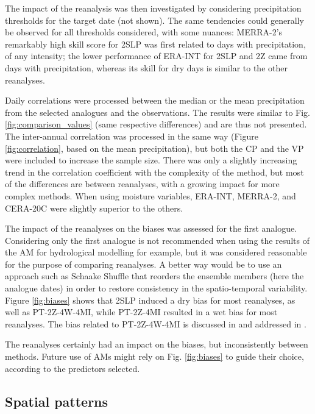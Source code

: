 \documentclass[smallextended]{svjour3}       %
\begin{document}
	The impact of the reanalysis was then investigated by considering precipitation thresholds for the target date (not shown). The same tendencies could generally be observed for all thresholds considered, with some nuances: MERRA-2's remarkably high skill score for 2SLP was first related to days with precipitation, of any intensity; the lower performance of ERA-INT for 2SLP and 2Z came from days with precipitation, whereas its skill for dry days is similar to the other reanalyses.
	
	Daily correlations were processed between the median or the mean precipitation from the selected analogues and the observations. The results were similar to Fig. \ref{fig:comparison_values} (same respective differences) and are thus not presented. The inter-annual correlation was processed in the same way (Figure \ref{fig:correlation}, based on the mean precipitation), but both the CP and the VP were included to increase the sample size. There was only a slightly increasing trend in the correlation coefficient with the complexity of the method, but most of the differences are between reanalyses, with a growing impact for more complex methods. When using moisture variables, ERA-INT, MERRA-2, and CERA-20C were slightly superior to the others.
	
	The impact of the reanalyses on the biases was assessed for the first analogue. Considering only the first analogue is not recommended when using the results of the AM for hydrological modelling for example, but it was considered reasonable for the purpose of comparing reanalyses. A better way would be to use an approach such as Schaake Shuffle \citep{Clark2004a} that reorders the ensemble members (here the analogue dates) in order to restore consistency in the spatio-temporal variability. Figure \ref{fig:biases} shows that 2SLP induced a dry bias for most reanalyses, as well as PT-2Z-4W-4MI, while PT-2Z-4MI resulted in a wet bias for most reanalyses. The bias related to PT-2Z-4W-4MI is discussed in \citet{Caillouet2016} and addressed in \citet{Caillouet2017}. 
	
	The reanalyses certainly had an impact on the biases, but inconsistently between methods. Future use of AMs might rely on Fig. \ref{fig:biases} to guide their choice, according to the predictors selected.
	
	
	\subsection{Spatial patterns}
	
\end{document}
